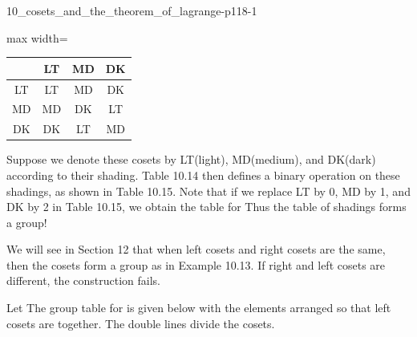 \documentclass[11pt,oneside]{article}
\begin{document}
\begin{BookBody}
\begin{BookFloat}{10_cosets_and_the_theorem_of_lagrange-p118-1}
\begin{center}
\begin{minipage}[t]{0.4416\linewidth}
\begin{center}\begin{adjustbox}{max width=\linewidth}
\renewcommand{\arraystretch}{1.2}\setlength{\tabcolsep}{5pt}
\begin{tabular}{c|c|c|c}
 & LT & MD & DK\\\hline
LT & LT & MD & DK\\\hline
MD & MD & DK & LT\\\hline
DK & DK & LT & MD\\
\end{tabular}
\end{adjustbox}\end{center}\end{minipage}
\end{center}
\end{BookFloat}

Suppose we denote these cosets by LT(light), MD(medium), and DK(dark) according to their shading. Table 10.14 then defines a binary operation on these shadings, as shown in Table 10.15. Note that if we replace LT by 0, MD by 1, and DK by 2 in Table 10.15, we obtain the table for  Thus the table of shadings forms a group!

We will see in Section 12 that when left cosets and right cosets are the same, then the cosets form a group as in Example 10.13. If right and left cosets are different, the construction fails.

 Let  The group table for  is given below with the elements arranged so that left cosets are together. The double lines divide the cosets.


\end{BookBody}
\end{document}
